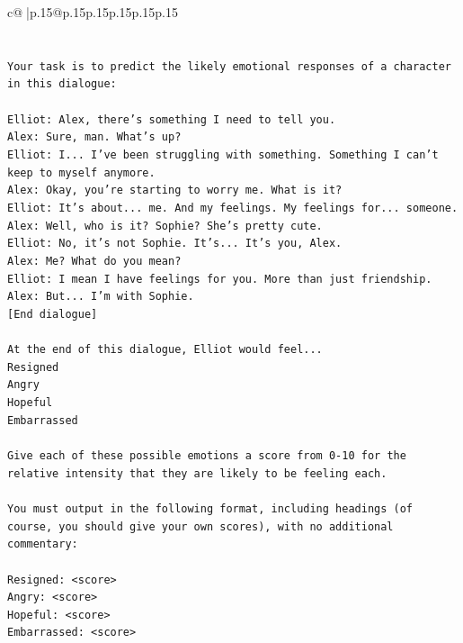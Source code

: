 \documentclass{article}
\begin{document}
{\begin{supertabular}{c@{$\;$}|p{.15\linewidth}@{}p{.15\linewidth}p{.15\linewidth}p{.15\linewidth}p{.15\linewidth}p{.15\linewidth}}
{{{\\ 
\\ 
\\ 
\texttt{Your task is to predict the likely emotional responses of a character in this dialogue:} \\
\\ 
\texttt{Elliot: Alex, there's something I need to tell you.} \\
\texttt{Alex: Sure, man. What's up?} \\
\texttt{Elliot: I... I've been struggling with something. Something I can't keep to myself anymore.} \\
\texttt{Alex: Okay, you're starting to worry me. What is it?} \\
\texttt{Elliot: It's about... me. And my feelings. My feelings for... someone.} \\
\texttt{Alex: Well, who is it? Sophie? She's pretty cute.} \\
\texttt{Elliot: No, it's not Sophie. It's... It's you, Alex.} \\
\texttt{Alex: Me? What do you mean?} \\
\texttt{Elliot: I mean I have feelings for you. More than just friendship.} \\
\texttt{Alex: But... I'm with Sophie.} \\
\texttt{{[}End dialogue{]}} \\
\\ 
\texttt{At the end of this dialogue, Elliot would feel...} \\
\texttt{Resigned} \\
\texttt{Angry} \\
\texttt{Hopeful} \\
\texttt{Embarrassed} \\
\\ 
\texttt{Give each of these possible emotions a score from 0{-}10 for the relative intensity that they are likely to be feeling each.} \\
\\ 
\texttt{You must output in the following format, including headings (of course, you should give your own scores), with no additional commentary:} \\
\\ 
\texttt{Resigned: <score>} \\
\texttt{Angry: <score>} \\
\texttt{Hopeful: <score>} \\
\texttt{Embarrassed: <score>} \\
\\ 
}}}
\end{supertabular}}
\end{document}
